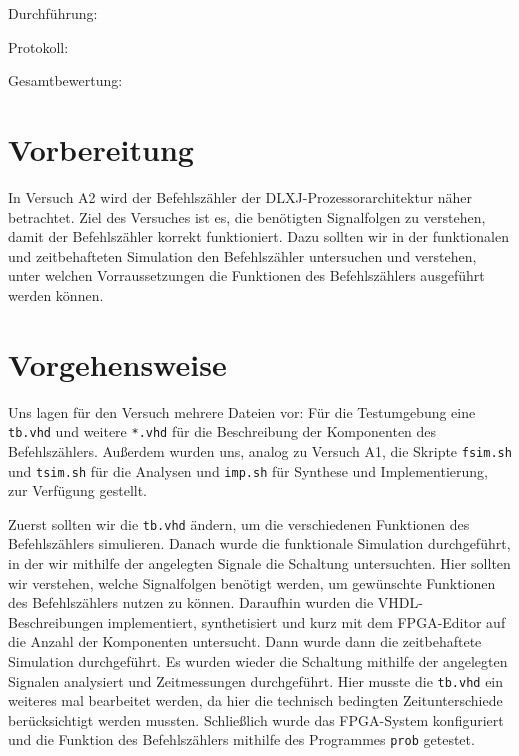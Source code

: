 \documentclass[12pt,a4paper]{scrartcl}
\begin{document}
Durchf\"uhrung:

Protokoll:

Gesamtbewertung:
\clearpage



\section{Vorbereitung}
In Versuch A2 wird der Befehlsz\"ahler der DLXJ-Prozessorarchitektur n\"aher betrachtet.
Ziel des Versuches ist es, die ben\"otigten Signalfolgen zu verstehen, damit der Befehlsz\"ahler korrekt funktioniert.
Dazu sollten wir in der funktionalen und zeitbehafteten Simulation den Befehlsz\"ahler untersuchen und verstehen, unter welchen Vorraussetzungen
die Funktionen des Befehlsz\"ahlers ausgef\"uhrt werden k\"onnen.

\section{Vorgehensweise}

Uns lagen f\"ur den Versuch mehrere Dateien vor: F\"ur die Testumgebung eine \texttt{tb.vhd} und weitere \texttt{*.vhd} f\"ur die Beschreibung der Komponenten des Befehlsz\"ahlers. Au\ss erdem wurden uns, analog zu Versuch A1, die Skripte \texttt{fsim.sh} und \texttt{tsim.sh} f\"ur die Analysen und \texttt{imp.sh} für Synthese und Implementierung, zur Verf\"ugung gestellt.

Zuerst sollten wir die \texttt{tb.vhd} \"andern, um die verschiedenen Funktionen des Befehlsz\"ahlers simulieren. Danach wurde die funktionale Simulation durchgef\"uhrt, in der wir mithilfe der angelegten Signale die Schaltung untersuchten. Hier sollten wir verstehen, welche Signalfolgen ben\"otigt werden, um gew\"unschte Funktionen des Befehlsz\"ahlers nutzen zu k\"onnen. Daraufhin wurden die VHDL-Beschreibungen implementiert, synthetisiert und kurz mit dem FPGA-Editor auf die Anzahl der Komponenten untersucht. Dann wurde dann die zeitbehaftete Simulation durchgef\"uhrt. Es wurden wieder die Schaltung mithilfe der angelegten Signalen analysiert und Zeitmessungen durchgef\"uhrt. Hier musste die \texttt{tb.vhd} ein weiteres mal bearbeitet werden, da hier die technisch bedingten Zeitunterschiede ber\"ucksichtigt werden mussten. Schlie\ss lich wurde das FPGA-System konfiguriert und die Funktion des Befehlsz\"ahlers mithilfe des Programmes \texttt{prob} getestet.

\newpage
\end{document}
